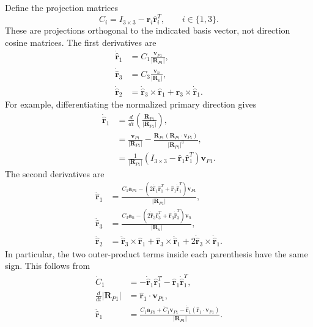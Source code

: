 Define the projection matrices
\[
    C_i = I_{3\times3} - \hat{\bm r}_i\hat{\bm r}_i^T,
    \qquad i\in\{1,3\}.
\]
These are projections orthogonal to the indicated basis vector, not direction cosine matrices. The first derivatives are
\begin{subequations}
    \begin{align}
        \dot{\hat{\bm r}}_1 &= C_1 \frac{\bm v_{P1}}{|\bm R_{P1}|}, \\
        \dot{\hat{\bm r}}_3 &= C_3 \frac{\bm v_n}{|\bm R_n|}, \\
        \dot{\hat{\bm r}}_2 &= \dot{\hat{\bm r}}_3 \times \hat{\bm r}_1
                              + \hat{\bm r}_3 \times \dot{\hat{\bm r}}_1.
    \end{align}
\end{subequations}
For example, differentiating the normalized primary direction gives
\begin{subequations}
    \begin{align}
        \dot{\hat{\bm r}}_1
            &= \frac{d}{dt}\left(\frac{\bm R_{P1}}{|\bm R_{P1}|}\right), \\
            &= \frac{\bm v_{P1}}{|\bm R_{P1}|}
               - \frac{\bm R_{P1}(\bm R_{P1}\cdot\bm v_{P1})}{|\bm R_{P1}|^3}, \\
            &= \frac{1}{|\bm R_{P1}|}
               (I_{3\times3}-\hat{\bm r}_1\hat{\bm r}_1^T)\bm v_{P1}.
    \end{align}
\end{subequations}
The second derivatives are
\begin{subequations}
    \begin{align}
        \ddot{\hat{\bm r}}_1
            &= \frac{C_1\bm a_{P1}
               -(2\dot{\hat{\bm r}}_1\hat{\bm r}_1^T
                  +\hat{\bm r}_1\dot{\hat{\bm r}}_1^T)\bm v_{P1}}
               {|\bm R_{P1}|}, \\
        \ddot{\hat{\bm r}}_3
            &= \frac{C_3\bm a_n
               -(2\dot{\hat{\bm r}}_3\hat{\bm r}_3^T
                  +\hat{\bm r}_3\dot{\hat{\bm r}}_3^T)\bm v_n}
               {|\bm R_n|}, \\
        \ddot{\hat{\bm r}}_2
            &= \ddot{\hat{\bm r}}_3\times\hat{\bm r}_1
               +\hat{\bm r}_3\times\ddot{\hat{\bm r}}_1
               +2\dot{\hat{\bm r}}_3\times\dot{\hat{\bm r}}_1.
    \end{align}
\end{subequations}
In particular, the two outer-product terms inside each parenthesis have the same sign. This follows from
\begin{subequations}
    \begin{align}
        \dot C_1 &= -\dot{\hat{\bm r}}_1\hat{\bm r}_1^T
                    -\hat{\bm r}_1\dot{\hat{\bm r}}_1^T, \\
        \frac{d}{dt}|\bm R_{P1}| &= \hat{\bm r}_1\cdot\bm v_{P1}, \\
        \ddot{\hat{\bm r}}_1
            &= \frac{C_1\bm a_{P1}+\dot C_1\bm v_{P1}
                -\dot{\hat{\bm r}}_1(\hat{\bm r}_1\cdot\bm v_{P1})}
                {|\bm R_{P1}|}.
    \end{align}
\end{subequations}

